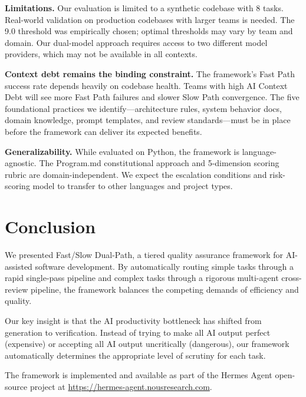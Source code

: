 \documentclass[11pt,a4paper]{article}
\begin{document}
\textbf{Limitations.} Our evaluation is limited to a synthetic codebase with 8 tasks. Real-world validation on production codebases with larger teams is needed. The 9.0 threshold was empirically chosen; optimal thresholds may vary by team and domain. Our dual-model approach requires access to two different model providers, which may not be available in all contexts.

\textbf{Context debt remains the binding constraint.} The framework's Fast Path success rate depends heavily on codebase health. Teams with high AI Context Debt will see more Fast Path failures and slower Slow Path convergence. The five foundational practices we identify---architecture rules, system behavior docs, domain knowledge, prompt templates, and review standards---must be in place before the framework can deliver its expected benefits.

\textbf{Generalizability.} While evaluated on Python, the framework is language-agnostic. The Program.md constitutional approach and 5-dimension scoring rubric are domain-independent. We expect the escalation conditions and risk-scoring model to transfer to other languages and project types.

\section{Conclusion}

We presented Fast/Slow Dual-Path, a tiered quality assurance framework for AI-assisted software development. By automatically routing simple tasks through a rapid single-pass pipeline and complex tasks through a rigorous multi-agent cross-review pipeline, the framework balances the competing demands of efficiency and quality.

Our key insight is that the AI productivity bottleneck has shifted from generation to verification. Instead of trying to make all AI output perfect (expensive) or accepting all AI output uncritically (dangerous), our framework automatically determines the appropriate level of scrutiny for each task.

The framework is implemented and available as part of the Hermes Agent open-source project at \url{https://hermes-agent.nousresearch.com}.
\end{document}
